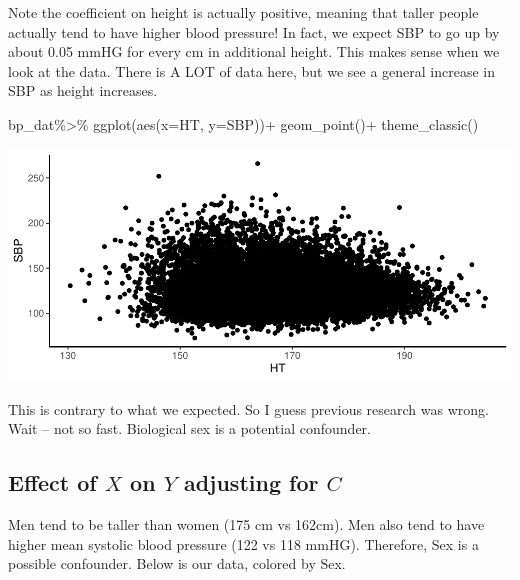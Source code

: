 \documentclass[
]{book}
\newenvironment{Shaded}{\begin{snugshade}}{\end{snugshade}}
\newcommand{\AttributeTok}[1]{\textcolor[rgb]{0.77,0.63,0.00}{#1}}
\newcommand{\FunctionTok}[1]{\textcolor[rgb]{0.00,0.00,0.00}{#1}}
\newcommand{\NormalTok}[1]{#1}
\newcommand{\SpecialCharTok}[1]{\textcolor[rgb]{0.00,0.00,0.00}{#1}}
\newcommand{\StringTok}[1]{\textcolor[rgb]{0.31,0.60,0.02}{#1}}
\begin{document}
Note the coefficient on height is actually positive, meaning that taller people actually tend to have higher blood pressure! In fact, we expect SBP to go up by about 0.05 mmHG for every cm in additional height. This makes sense when we look at the data. There is A LOT of data here, but we see a general increase in SBP as height increases.

\begin{Shaded}
\begin{Highlighting}[]
\NormalTok{bp\_dat}\SpecialCharTok{\%\textgreater{}\%}
  \FunctionTok{ggplot}\NormalTok{(}\FunctionTok{aes}\NormalTok{(}\AttributeTok{x=}\StringTok{\textasciigrave{}}\AttributeTok{HT}\StringTok{\textasciigrave{}}\NormalTok{,}
             \AttributeTok{y=}\StringTok{\textasciigrave{}}\AttributeTok{SBP}\StringTok{\textasciigrave{}}\NormalTok{))}\SpecialCharTok{+}
  \FunctionTok{geom\_point}\NormalTok{()}\SpecialCharTok{+}
  \FunctionTok{theme\_classic}\NormalTok{()}
\end{Highlighting}
\end{Shaded}

\includegraphics{MA206supplement_files/figure-latex/unnamed-chunk-4-1.pdf}

This is contrary to what we expected. So I guess previous research was wrong. Wait -- not so fast. Biological sex is a potential confounder.

\hypertarget{effect-of-x-on-y-adjusting-for-c}{%
\subsection{\texorpdfstring{Effect of \(X\) on \(Y\) adjusting for \(C\)}{Effect of X on Y adjusting for C}}\label{effect-of-x-on-y-adjusting-for-c}}

Men tend to be taller than women (175 cm vs 162cm). Men also tend to have higher mean systolic blood pressure (122 vs 118 mmHG). Therefore, Sex is a possible confounder. Below is our data, colored by Sex.
\end{document}
